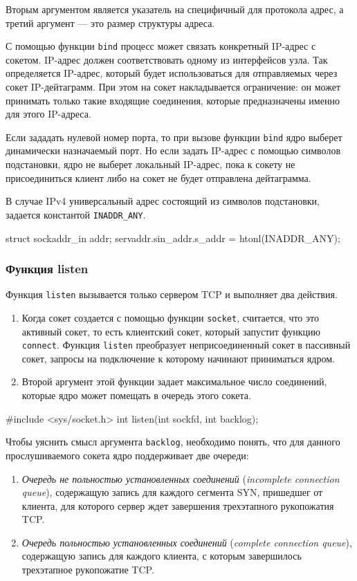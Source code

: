 Вторым аргументом является указатель на специфичный для протокола адрес, а третий аргумент --- это размер структуры адреса.

С помощью функции \lstinline{bind} процесс может связать конкретный IP-адрес с сокетом. IP-адрес должен соответствовать одному из интерфейсов узла. Так определяется IP-адрес, который будет использоваться для отправляемых через сокет IP-дейтаграмм. При этом на сокет накладывается ограничение: он может принимать только такие входящие соединения, которые предназначены именно для этого IP-адреса.

Если зададать нулевой номер порта, то при вызове функции \lstinline{bind} ядро выберет динамически назначаемый порт. Но если задать IP-адрес с помощью символов подстановки, ядро не выберет локальный IP-адрес, пока к сокету не присоединиться клиент либо на сокет не будет отправлена дейтаграмма.

В случае IPv4 универсальный адрес состоящий из символов подстановки, задается константой \lstinline{INADDR_ANY}.
\begin{clst}{}{}
struct sockaddr_in addr;
servaddr.sin_addr.s_addr = htonl(INADDR_ANY);
\end{clst}

\subsubsection{Функция listen}
Функция \lstinline{listen} вызывается только сервером TCP и выполняет два действия.
\begin{enumerate}
  \item Когда сокет создается с помощью функции \lstinline{socket}, считается, что это активный сокет, то есть клиентский сокет, который запустит функцию \lstinline{connect}. Функция \lstinline{listen} преобразует неприсоединенный сокет в пассивный сокет, запросы на подключение к которому начинают приниматься ядром.
  \item Второй аргумент этой функции задает максимальное число соединений, которые ядро может помещать в очередь этого сокета.
\end{enumerate}

\begin{clst}{}{}
#include <sys/socket.h>
int listen(int sockfd, int backlog);
\end{clst}{}{}

Чтобы уяснить смысл аргумента \lstinline{backlog}, необходимо понять, что для данного прослушиваемого сокета ядро поддерживает две очереди:
\begin{enumerate}
  \item \emph{Очередь не польностью установленных соединений} (\emph{incomplete connection queue}), содержащую запись для каждого сегмента SYN, пришедшег от клиента, для которого сервер ждет завершения трехэтапного рукопожатия TCP.
  \item \emph{Очередь польностью установленных соединений} (\emph{complete connection queue}), содержащую запись для каждого клиента, с которым завершилось трехэтапное рукопожатие TCP.
\end{enumerate}

